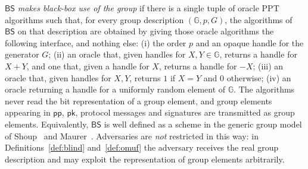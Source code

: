 \documentclass{conjura-conjecture}
\newcommand{\BS}{\mathsf{BS}}
\newcommand{\GG}{\mathbb{G}}
\newcommand{\pubp}{\mathsf{pp}}
\newcommand{\pubk}{\mathsf{pk}}
\begin{document}
\begin{definition}\label{def:bb}
$\BS$ \emph{makes black-box use of the group} if there is a single tuple
of oracle PPT algorithms such that, for every group description
$(\GG, p, G)$, the algorithms of $\BS$ on that description are obtained by
giving those oracle algorithms the following interface, and nothing else:
(i) the order $p$ and an opaque handle for the generator $G$; (ii) an
oracle that, given handles for $X, Y \in \GG$, returns a handle for
$X + Y$, and one that, given a handle for $X$, returns a handle for $-X$;
(iii) an oracle that, given handles for $X, Y$, returns $1$ if $X = Y$ and
$0$ otherwise; (iv) an oracle returning a handle for a uniformly random
element of $\GG$. The algorithms never read the bit representation of a
group element, and group elements appearing in $\pubp$, $\pubk$, protocol
messages and signatures are transmitted as group elements. Equivalently,
$\BS$ is well defined as a scheme in the generic group model of
Shoup~\cite{Sho97} and Maurer~\cite{Mau05}. Adversaries are \emph{not}
restricted in this way: in Definitions~\ref{def:blind} and~\ref{def:omuf}
the adversary receives the real group description and may exploit the
representation of group elements arbitrarily.
\end{definition}
\end{document}
